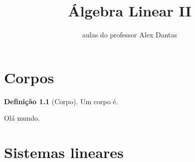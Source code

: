 \documentclass{scrreprt}
\title{Álgebra Linear II}
\author{aulas do professor Alex Dantas}
\theoremstyle{definition}
\newtheorem{definition}{Definição}
\begin{document}
\maketitle

\chapter{Corpos}

\begin{definition}[Corpo]
  Um corpo é.
\end{definition}
Olá mundo.

\chapter{Sistemas lineares}
\end{document}
